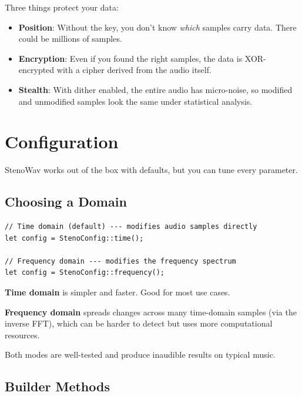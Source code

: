 \documentclass[11pt,a4paper]{article}
\begin{document}
Three things protect your data:
\begin{itemize}
    \item \textbf{Position}: Without the key, you don't know \emph{which}
          samples carry data.  There could be millions of samples.
    \item \textbf{Encryption}: Even if you found the right samples, the
          data is XOR-encrypted with a cipher derived from the audio itself.
    \item \textbf{Stealth}: With dither enabled, the entire audio has
          micro-noise, so modified and unmodified samples look the same
          under statistical analysis.
\end{itemize}


\section{Configuration}

StenoWav works out of the box with defaults, but you can tune every
parameter.

\subsection{Choosing a Domain}

\begin{lstlisting}[style=rust]
// Time domain (default) --- modifies audio samples directly
let config = StenoConfig::time();

// Frequency domain --- modifies the frequency spectrum
let config = StenoConfig::frequency();
\end{lstlisting}

\begin{infobox}
\textbf{Time domain} is simpler and faster.  Good for most use cases.

\textbf{Frequency domain} spreads changes across many time-domain samples
(via the inverse FFT), which can be harder to detect but uses more
computational resources.

Both modes are well-tested and produce inaudible results on typical music.
\end{infobox}

\subsection{Builder Methods}
\end{document}
